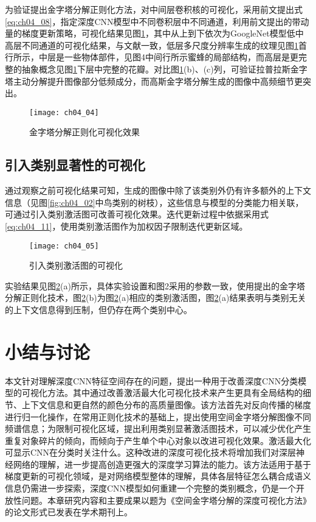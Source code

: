 为验证提出金字塔分解正则化方法，对中间层卷积核的可视化，采用前文提出式\ref{eq:ch04_08}，指定深度CNN模型中不同卷积层中不同通道，利用前文提出的带动量的梯度更新策略，可视化结果见图\ref{fig:ch04_04}，其中从上到下依次为GoogleNet模型低中高层不同通道的可视化结果，与文献\citep{Zeiler2014}一致，低层多尺度分辨率生成的纹理见图\ref{fig:ch04_04}首行所示，中层是一些物体部件，见图4中间行所示蜜蜂的局部结构，而高层是更完整的抽象概念见图\ref{fig:ch04_04}下层中完整的花瓣。对比图\ref{fig:ch04_04}(b)、(c)列，可验证拉普拉斯金字塔主动分解提升图像部分低频成分，而高斯金字塔分解生成的图像中高频细节更突出。
\begin{figure}[!htbp]
\centering
\texttt{[image: ch04\_04]}
\caption{金字塔分解正则化可视化效果}
\label{fig:ch04_04}
\end{figure} 

\subsection{引入类别显著性的可视化} 

通过观察之前可视化结果可知，生成的图像中除了该类别外仍有许多额外的上下文信息（见图\ref{fig:ch04_02}中鸟类别的树枝），这些信息与模型的分类能力相关联，可通过引入类别激活图可改善可视化效果。迭代更新过程中依据采用式\ref{eq:ch04_11}，使用类别激活图作为加权因子限制迭代更新区域。
\begin{figure}[!htbp]
\centering
\texttt{[image: ch04\_05]}
\caption{引入类别激活图的可视化}
\label{fig:ch04_05}
\end{figure}  

实验结果见图\ref{fig:ch04_05}(a)所示，具体实验设置和图2采用的参数一致，使用提出的金字塔分解正则化技术，图\ref{fig:ch04_05}(b)为图\ref{fig:ch04_05}(a)相应的类别激活图，图\ref{fig:ch04_05}(a)结果表明与类别无关的上下文信息得到压制，但仍存在两个类别中心。

\section{小结与讨论}

本文针对理解深度CNN特征空间存在的问题，提出一种用于改善深度CNN分类模型的可视化方法。其中通过改善激活最大化可视化技术来产生更具有全局结构的细节、上下文信息和更自然的颜色分布的高质量图像。该方法首先对反向传播的梯度进行归一化操作，在常用正则化技术的基础上，提出使用空间金字塔分解图像不同频谱信息；为限制可视化区域，提出利用类别显著激活图技术，可以减少优化产生重复对象碎片的倾向，而倾向于产生单个中心对象以改进可视化效果。激活最大化可显示CNN在分类时关注什么。这种改进的深度可视化技术将增加我们对深层神经网络的理解，进一步提高创造更强大的深度学习算法的能力。该方法适用于基于梯度更新的可视化领域，是对网络模型整体的理解，具体各层特征怎么耦合成语义信息仍需进一步探索，深度CNN模型如何重建一个完整的类别概念，仍是一个开放性问题。本章研究内容和主要成果以题为《空间金字塔分解的深度可视化方法》的论文形式已发表在学术期刊上\citep{tao2017ha}。

